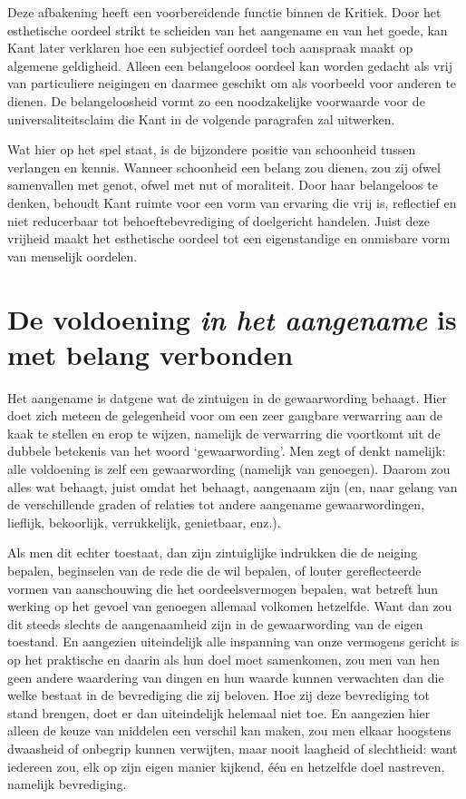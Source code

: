 \begin{mdframed}[leftmargin=0pt,rightmargin=0pt,backgroundcolor=blue!6,linecolor=white,innertopmargin=6pt,innerbottommargin=6pt]
Deze afbakening heeft een voorbereidende functie binnen de Kritiek. Door het esthetische oordeel strikt te scheiden van het aangename en van het goede, kan Kant later verklaren hoe een subjectief oordeel toch aanspraak maakt op algemene geldigheid. Alleen een belangeloos oordeel kan worden gedacht als vrij van particuliere neigingen en daarmee geschikt om als voorbeeld voor anderen te dienen. De belangeloosheid vormt zo een noodzakelijke voorwaarde voor de universaliteitsclaim die Kant in de volgende paragrafen zal uitwerken.

Wat hier op het spel staat, is de bijzondere positie van schoonheid tussen verlangen en kennis. Wanneer schoonheid een belang zou dienen, zou zij ofwel samenvallen met genot, ofwel met nut of moraliteit. Door haar belangeloos te denken, behoudt Kant ruimte voor een vorm van ervaring die vrij is, reflectief en niet reducerbaar tot behoeftebevrediging of doelgericht handelen. Juist deze vrijheid maakt het esthetische oordeel tot een eigenstandige en onmisbare vorm van menselijk oordelen.

\end{mdframed}

\section{De voldoening \textit{in het aangename} is met belang verbonden}

Het aangename is datgene wat de zintuigen in de gewaarwording behaagt.
Hier doet zich meteen de gelegenheid voor om een zeer gangbare verwarring aan de kaak te stellen en erop te wijzen, namelijk de verwarring die voortkomt uit de dubbele betekenis van het woord ‘gewaarwording’. Men zegt of denkt namelijk: alle voldoening is zelf een gewaarwording (namelijk van genoegen). Daarom zou alles wat behaagt, juist omdat het behaagt, aangenaam zijn (en, naar gelang van de verschillende graden of relaties tot andere aangename gewaarwordingen, lieflijk, bekoorlijk, verrukkelijk, genietbaar, enz.).

Als men dit echter toestaat, dan zijn zintuiglijke indrukken die de neiging bepalen, beginselen van de rede die de wil bepalen, of louter gereflecteerde vormen van aanschouwing die het oordeelsvermogen bepalen, wat betreft hun werking op het gevoel van genoegen allemaal volkomen hetzelfde. Want dan zou dit steeds slechts de aangenaamheid zijn in de gewaarwording van de eigen toestand. En aangezien uiteindelijk alle inspanning van onze vermogens gericht is op het praktische en daarin als hun doel moet samenkomen, zou men van hen geen andere waardering van dingen en hun waarde kunnen verwachten dan die welke bestaat in de bevrediging die zij beloven. Hoe zij deze bevrediging tot stand brengen, doet er dan uiteindelijk helemaal niet toe. En aangezien hier alleen de keuze van middelen een verschil kan maken, zou men elkaar hoogstens dwaasheid of onbegrip kunnen verwijten, maar nooit laagheid of slechtheid: want iedereen zou, elk op zijn eigen manier kijkend, één en hetzelfde doel nastreven, namelijk bevrediging.

